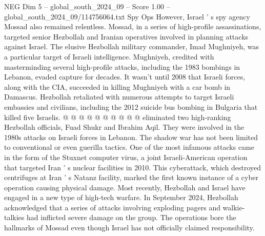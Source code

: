 \begin{textsample}{NEG Dim 5 – global\_south\_2024\_09 – Score 1.00 – global\_south\_2024\_09/114756064.txt}
Spy Ops However, Israel ' s spy agency Mossad also remained relentless.
Mossad, in a series of high-profile assassinations, targeted senior Hezbollah and Iranian operatives involved in planning attacks against Israel.
The elusive Hezbollah military commander, Imad Mughniyeh, was a particular target of Israeli intelligence.
Mughniyeh, credited with masterminding several high-profile attacks, including the 1983 bombings in Lebanon, evaded capture for decades.
It wasn't until 2008 that Israeli forces, along with the CIA, succeeded in killing Mughniyeh with a car bomb in Damascus.
Hezbollah retaliated with numerous attempts to target Israeli embassies and civilians, including the 2012 suicide bus bombing in Bulgaria that killed five Israelis. @ @ @ @ @ @ @ @ @ @ eliminated two high-ranking Hezbollah officials, Fuad Shukr and Ibrahim Aqil.
They were involved in the 1980s attacks on Israeli forces in Lebanon.
The shadow war has not been limited to conventional or even guerilla tactics.
One of the most infamous attacks came in the form of the Stuxnet computer virus, a joint Israeli-American operation that targeted Iran ' s nuclear facilities in 2010.
This cyberattack, which destroyed centrifuges at Iran ' s Natanz facility, marked the first known instance of a cyber operation causing physical damage.
Most recently, Hezbollah and Israel have engaged in a new type of high-tech warfare.
In September 2024, Hezbollah acknowledged that a series of attacks involving exploding pagers and walkie-talkies had inflicted severe damage on the group.
The operations bore the hallmarks of Mossad even though Israel has not officially claimed responsibility.

\end{textsample}
